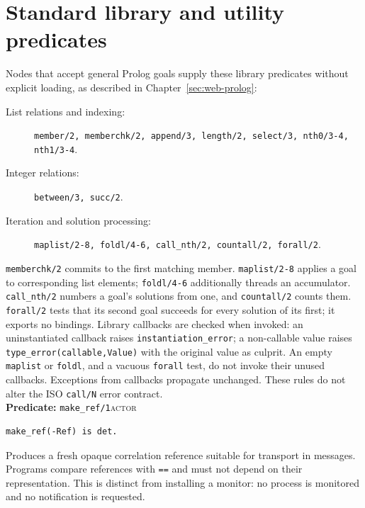 \section{Standard library and utility predicates}\label{sec:manual-standard-library}

Nodes that accept general Prolog goals supply these library predicates
without explicit loading, as described in Chapter~\ref{sec:web-prolog}:

\begin{description}
\item[List relations and indexing:]
\texttt{member/\allowbreak{}2,\allowbreak{} memberchk/\allowbreak{}2,\allowbreak{} append/\allowbreak{}3,\allowbreak{} length/\allowbreak{}2,\allowbreak{} select/\allowbreak{}3,\allowbreak{}
nth0/\allowbreak{}3-4,\allowbreak{} nth1/\allowbreak{}3-4}.
\item[Integer relations:]
\texttt{between/\allowbreak{}3,\allowbreak{} succ/\allowbreak{}2}.
\item[Iteration and solution processing:]
\texttt{maplist/\allowbreak{}2-8,\allowbreak{} foldl/\allowbreak{}4-6,\allowbreak{} call\_\allowbreak{}nth/\allowbreak{}2,\allowbreak{} countall/\allowbreak{}2,\allowbreak{} forall/\allowbreak{}2}.
\end{description}

\noindent \texttt{memberchk/\allowbreak{}2} commits to the first matching member.
\texttt{maplist/\allowbreak{}2-8} applies a goal to corresponding list elements;
\texttt{foldl/\allowbreak{}4-6} additionally threads an accumulator.
\texttt{call\_\allowbreak{}nth/\allowbreak{}2} numbers a goal's solutions from one, and
\texttt{countall/\allowbreak{}2} counts them. \texttt{forall/\allowbreak{}2} tests that its second
goal succeeds for every solution of its first; it exports no bindings.
Library callbacks are checked when invoked: an uninstantiated callback raises
\texttt{instantiation\_error}; a non-callable value raises
\texttt{type\_error(callable,Value)} with the original value as culprit.
An empty \texttt{maplist} or \texttt{foldl}, and a vacuous \texttt{forall} test,
do not invoke their unused callbacks. Exceptions from callbacks propagate unchanged.
These rules do not alter the ISO \texttt{call/N} error contract.\\

\noindent \textbf{Predicate:} \texttt{make\_\allowbreak{}ref/\allowbreak{}1}\hfill\textsc{actor}
\begin{verbatim}
make_ref(-Ref) is det.
\end{verbatim}
\noindent Produces a fresh opaque correlation reference suitable for
transport in messages. Programs compare references with \texttt{==} and
must not depend on their representation. This is distinct from installing
a monitor: no process is monitored and no notification is requested.\\

